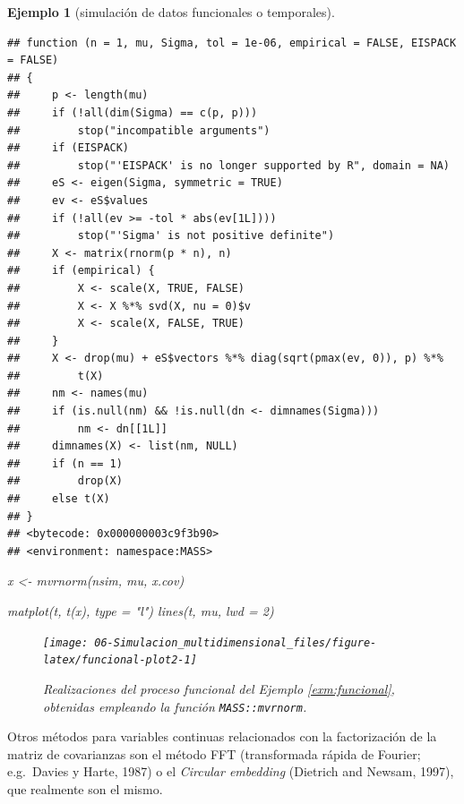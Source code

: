 \documentclass[
]{book}
\newenvironment{Shaded}{\begin{snugshade}}{\end{snugshade}}
\newcommand{\AttributeTok}[1]{\textcolor[rgb]{0.77,0.63,0.00}{#1}}
\newcommand{\DecValTok}[1]{\textcolor[rgb]{0.00,0.00,0.81}{#1}}
\newcommand{\FunctionTok}[1]{\textcolor[rgb]{0.00,0.00,0.00}{#1}}
\newcommand{\NormalTok}[1]{#1}
\newcommand{\OtherTok}[1]{\textcolor[rgb]{0.56,0.35,0.01}{#1}}
\newcommand{\StringTok}[1]{\textcolor[rgb]{0.31,0.60,0.02}{#1}}
\theoremstyle{break}
\newtheorem{example}{Ejemplo}[chapter]
\theoremstyle{nonumberplain}
\begin{document}
\begin{example}[simulación de datos funcionales o temporales]
\begin{verbatim}
## function (n = 1, mu, Sigma, tol = 1e-06, empirical = FALSE, EISPACK = FALSE) 
## {
##     p <- length(mu)
##     if (!all(dim(Sigma) == c(p, p))) 
##         stop("incompatible arguments")
##     if (EISPACK) 
##         stop("'EISPACK' is no longer supported by R", domain = NA)
##     eS <- eigen(Sigma, symmetric = TRUE)
##     ev <- eS$values
##     if (!all(ev >= -tol * abs(ev[1L]))) 
##         stop("'Sigma' is not positive definite")
##     X <- matrix(rnorm(p * n), n)
##     if (empirical) {
##         X <- scale(X, TRUE, FALSE)
##         X <- X %*% svd(X, nu = 0)$v
##         X <- scale(X, FALSE, TRUE)
##     }
##     X <- drop(mu) + eS$vectors %*% diag(sqrt(pmax(ev, 0)), p) %*% 
##         t(X)
##     nm <- names(mu)
##     if (is.null(nm) && !is.null(dn <- dimnames(Sigma))) 
##         nm <- dn[[1L]]
##     dimnames(X) <- list(nm, NULL)
##     if (n == 1) 
##         drop(X)
##     else t(X)
## }
## <bytecode: 0x000000003c9f3b90>
## <environment: namespace:MASS>
\end{verbatim}

\begin{Shaded}
\begin{Highlighting}[]
\NormalTok{x }\OtherTok{\textless{}{-}} \FunctionTok{mvrnorm}\NormalTok{(nsim, mu, x.cov)}

\FunctionTok{matplot}\NormalTok{(t, }\FunctionTok{t}\NormalTok{(x), }\AttributeTok{type =} \StringTok{"l"}\NormalTok{)}
\FunctionTok{lines}\NormalTok{(t, mu, }\AttributeTok{lwd =} \DecValTok{2}\NormalTok{)}
\end{Highlighting}
\end{Shaded}

\begin{figure}[!htb]

{\centering \texttt{[image: 06-Simulacion\_multidimensional\_files/figure-latex/funcional-plot2-1]} 

}

\caption{Realizaciones del proceso funcional del Ejemplo \ref{exm:funcional}, obtenidas empleando la función \texttt{MASS::mvrnorm}.}\label{fig:funcional-plot2}
\end{figure}

\end{example}

Otros métodos para variables continuas relacionados con la factorización de la matriz de covarianzas son el método FFT (transformada rápida de Fourier; e.g.~Davies y Harte, 1987) o el \emph{Circular embedding} (Dietrich and Newsam, 1997), que realmente son el mismo.
\end{document}
